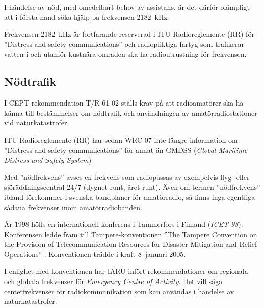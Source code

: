 \begin{center}
\begin{minipage}{0.19\columnwidth}
\Huge{\selectfont{}\relax}
\end{minipage}
\begin{minipage}{0.7\columnwidth}
I händelse av nöd, med omedelbart behov av assistans, är det därför
olämpligt att i första hand söka hjälp på frekvensen 2182~kHz.
\end{minipage}
\end{center}


Frekvensen 2182~kHz är fortfarande reserverad i ITU Radioreglemente (RR)
\cite{ITU-RR} för ''Distress and safety communications'' och radiopliktiga
fartyg som trafikerar vatten i och utanför kustnära områden ska ha
radioutrustning för frekvensen.

\subsection{Nödtrafik}
\label{nödtrafik}

I CEPT-rekommendation T/R 61-02 \cite{TR6102} ställs krav på att radioamatörer
ska ha känna till bestämmelser om nödtrafik och användningen av
amatörradiostationer vid naturkatastrofer.

ITU Radioreglemente (RR) \cite{ITU-RR} har sedan WRC-07 inte längre information
om ''Distress and safety communications'' för annat än
GMDSS (\emph{Global Maritime Distress and Safety System})

Med ''nödfrekvens'' avses en frekvens som radiopassas av exempelvis flyg- eller
sjöräddningscentral 24/7 (dygnet runt, året runt).
Även om termen ''nödfrekvens'' ibland förekommer i svenska bandplaner för
amatörradio, så finns inga egentliga sådana frekvenser inom amatörradiobanden.

År 1998 hölls en internationell konferens i Tammerfors i Finland
(\emph{ICET-98}).
Konferensen ledde fram till Tampere-konventionen ''The Tampere Convention on
the Provision of Telecommunication Resources for Disaster Mitigation and Relief
Operations'' \cite{TampereConvention}.
Konventionen trädde i kraft 8~januari 2005.

I enlighet med konventionen har IARU infört rekommendationer om regionala och
globala frekvenser för \emph{Emergency Centre of Activity}.
Det vill säga centerfrekvenser för radiokommunikation som kan användas i
händelse av naturkatastrofer.

